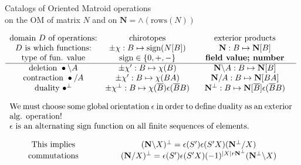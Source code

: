 \documentclass{beamer}
\newcommand{\ext}[1]{\ensuremath{\mathbf{#1}}}
\begin{document}
\begin{frame}{Catalogs of Oriented Matroid operations\\
    on the OM of matrix $N$ and on
    $\ext{N}=\wedge(\text{rows}(N))$}

\hspace*{-0.35in}$
    \begin{array}{ccc}
\text{domain $D$ of operations:} &  \text{chirotopes}            & \text{exterior products} \\
\text{$D$ is which functions:}                & \pm\chi:B\mapsto\text{sign}(N[B]) & \ext{N}:B\mapsto\ext{N}[B] \\
\text{type of fun. value}                   & \text{sign}\in\{0,+,-\} &  \text{\bf field value; number}\\ \hline
\text{deletion\ } \bullet\backslash A  & \pm\chi':B\mapsto\chi(B) & \ext{N}\backslash A:B\mapsto\ext{N}[B]  \\
\text{contraction\ }\bullet / A             & \pm\chi':B\mapsto\chi(BA) & \ext{N}/A:B\mapsto\ext{N}[BA] \\

\text{duality\ }\bullet^{\perp} & \pm\chi^{\perp}:B\mapsto\chi(\overline{B})\epsilon(\overline{B}B) &
\ext{N}^{\perp}:B\mapsto\ext{N}[\overline{B}]\epsilon(\overline{B}B) \\ \\
\multicolumn{3}{c}{\parbox{\textwidth}{We must choose some global orientation $\epsilon$ in order to define duality as an exterior alg. operation!
    \\
    $\epsilon$ is an alternating sign function on all finite sequences of elements. }}\\ \\ 
\text{This implies} & \multicolumn{2}{c}{(\ext{N}\backslash X)^\perp = \epsilon(S')\epsilon(S'X)(\ext{N}^\perp/X)}  \\
\text{commutations} & \multicolumn{2}{c}{(\ext{N}/X)^\perp = \epsilon(S')\epsilon(S'X)(-1)^{|X|r\ext{N}^\perp}(\ext{N}^\perp\backslash X)}\\

    \end{array}
    $
\end{frame}
\end{document}

